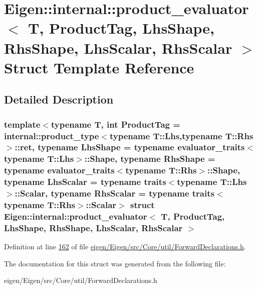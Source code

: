 \hypertarget{struct_eigen_1_1internal_1_1product__evaluator}{}\section{Eigen\+:\+:internal\+:\+:product\+\_\+evaluator$<$ T, Product\+Tag, Lhs\+Shape, Rhs\+Shape, Lhs\+Scalar, Rhs\+Scalar $>$ Struct Template Reference}
\label{struct_eigen_1_1internal_1_1product__evaluator}


\subsection{Detailed Description}
\subsubsection*{template$<$typename T, int Product\+Tag = internal\+::product\+\_\+type$<$typename T\+::\+Lhs,typename T\+::\+Rhs$>$\+::ret, typename Lhs\+Shape = typename evaluator\+\_\+traits$<$typename T\+::\+Lhs$>$\+::\+Shape, typename Rhs\+Shape = typename evaluator\+\_\+traits$<$typename T\+::\+Rhs$>$\+::\+Shape, typename Lhs\+Scalar = typename traits$<$typename T\+::\+Lhs$>$\+::\+Scalar, typename Rhs\+Scalar = typename traits$<$typename T\+::\+Rhs$>$\+::\+Scalar$>$\newline
struct Eigen\+::internal\+::product\+\_\+evaluator$<$ T, Product\+Tag, Lhs\+Shape, Rhs\+Shape, Lhs\+Scalar, Rhs\+Scalar $>$}



Definition at line \hyperlink{eigen_2_eigen_2src_2_core_2util_2_forward_declarations_8h_source_l00162}{162} of file \hyperlink{eigen_2_eigen_2src_2_core_2util_2_forward_declarations_8h_source}{eigen/\+Eigen/src/\+Core/util/\+Forward\+Declarations.\+h}.



The documentation for this struct was generated from the following file\+:\begin{DoxyCompactItemize}
\item 
eigen/\+Eigen/src/\+Core/util/\+Forward\+Declarations.\+h\end{DoxyCompactItemize}

